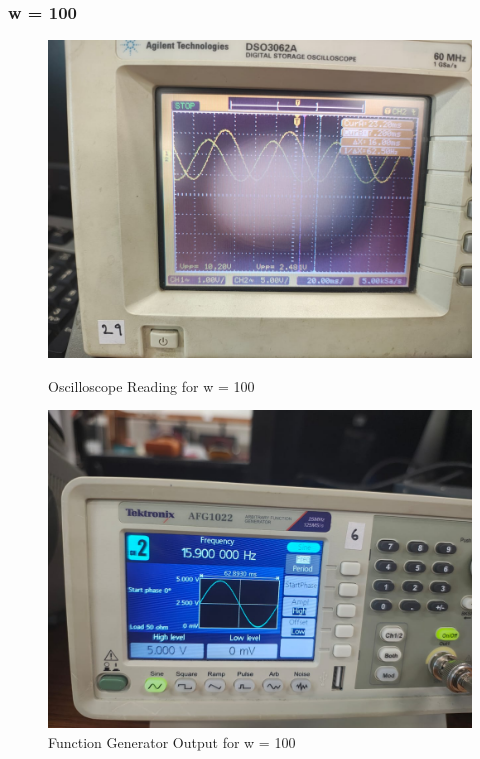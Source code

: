 \documentclass[a4paper,12pt]{article}
\begin{document}
\subsubsection{w = 100}
\begin{figure}[H]
    \centering
    \begin{minipage}{0.48\textwidth}
        \centering
        \includegraphics[width=\textwidth]{fig/2w100o.jpeg} %
        \caption{Oscilloscope Reading for w = 100}
    \end{minipage}
    \hfill
    \begin{minipage}{0.48\textwidth}
        \centering
        \includegraphics[width=\textwidth]{fig/1w100.jpeg} %
        \caption{Function Generator Output for w = 100}
    \end{minipage}
\end{figure}
\end{document}
